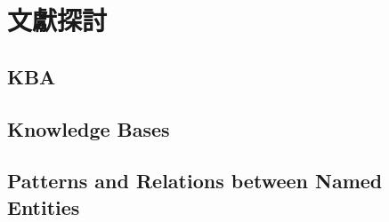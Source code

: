\chapter{文獻探討}
\label{c:related}

\section{KBA}

\section{Knowledge Bases}

\section{Patterns and Relations between Named Entities}


%
%

